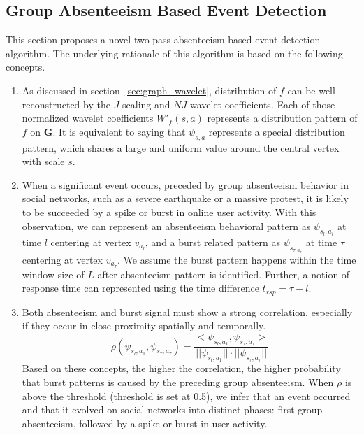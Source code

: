 \subsection{Group Absenteeism Based Event Detection}
\label{sec:event_detection}
This section proposes a novel two-pass absenteeism based event detection algorithm. The underlying rationale of this algorithm is based on the following concepts.
\begin{enumerate}
\item As discussed in section~\ref{sec:graph_wavelet}, distribution of $f$ can be well reconstructed by the $J$ scaling and $NJ$ wavelet coefficients. Each of those normalized wavelet coefficients $W'_f(s,a)$ represents a distribution pattern of $f$ on $\mathbf{G}$.
It is equivalent to saying that $\psi_{s,a}$ represents a special distribution pattern, which shares a large and uniform value around the central vertex with scale $s$.
\item When a significant event occurs, preceded by group absenteeism behavior in social networks, such as a severe earthquake or a massive protest, it is likely to be succeeded by a spike or burst in online user activity.
With this observation, we can represent an absenteeism behavioral pattern as $\psi_{s_l,a_l}$ at time $l$ centering at vertex $v_{a_l}$, and a burst related pattern as $\psi_{s_{\tau,a_\tau}}$ at time $\tau$ centering at vertex $v_{a_\tau}$. We assume the burst pattern happens within the time window size of $L$ after absenteeism pattern is identified. Further, a notion of response time can represented using the time difference $t_{rsp}=\tau-l$.
\item Both absenteeism and burst signal must show a strong correlation, especially if they occur in close proximity spatially and temporally.
\begin{equation}
\label{eq:eventsimilarity}
\rho(\psi_{s_l,a_1}, \psi_{s_\tau,a_\tau})= \frac{<\psi_{s_l,a_1}, \psi_{s_\tau,a_\tau}>}{||\psi_{s_l,a_1}||\cdot ||\psi_{s_\tau,a_\tau}||}
\end{equation}
Based on these concepts, the higher the correlation, the higher probability that burst patterns is caused by the preceding group absenteeism. When $\rho$ is above the threshold (threshold is set at 0.5), we infer that an event occurred and that it evolved on social networks into distinct phases: first group absenteeism, followed by a spike or burst in user activity.
\end{enumerate}


